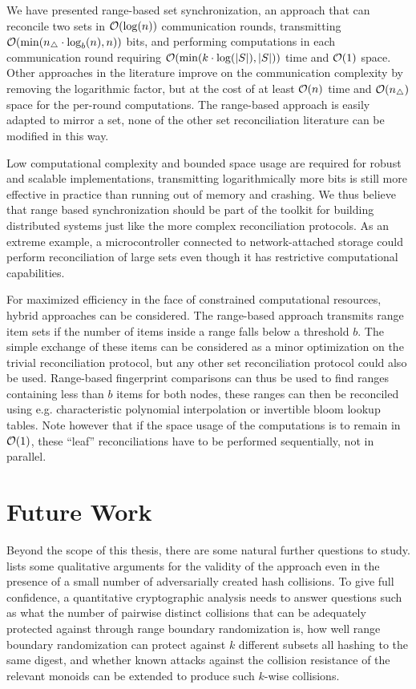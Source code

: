 
We have presented range-based set synchronization, an approach that can reconcile two sets in $\mathcal{O}(\log(n))$ communication rounds, transmitting $\mathcal{O}(\min(n_{\triangle} \cdot \log_b(n), n))$ bits, and performing computations in each communication round requiring $\mathcal{O}(\min(k \cdot \log(|{S}|), |{S}|))$ time and $\mathcal{O}(1)$ space. Other approaches in the literature improve on the communication complexity by removing the logarithmic factor, but at the cost of at least $\mathcal{O}(n)$ time and $\mathcal{O}(n_{\triangle})$ space for the per-round computations. The range-based approach is easily adapted to mirror a set, none of the other set reconciliation literature can be modified in this way.

Low computational complexity and bounded space usage are required for robust and scalable implementations, transmitting logarithmically more bits is still more effective in practice than running out of memory and crashing. We thus believe that range based synchronization should be part of the toolkit for building distributed systems just like the more complex reconciliation protocols. As an extreme example, a microcontroller connected to network-attached storage could perform reconciliation of large sets even though it has restrictive computational capabilities.

For maximized efficiency in the face of constrained computational resources, hybrid approaches can be considered. The range-based approach transmits range item sets if the number of items inside a range falls below a threshold $b$. The simple exchange of these items can be considered as a minor optimization on the trivial reconciliation protocol, but any other set reconciliation protocol could also be used. Range-based fingerprint comparisons can thus be used to find ranges containing less than $b$ items for both nodes, these ranges can then be reconciled using e.g. characteristic polynomial interpolation or invertible bloom lookup tables. Note however that if the space usage of the computations is to remain in $\mathcal{O}(1)$, these ``leaf'' reconciliations have to be performed sequentially, not in parallel.

\section{Future Work}

Beyond the scope of this thesis, there are some natural further questions to study.  lists some qualitative arguments for the validity of the approach even in the presence of a small number of adversarially created hash collisions. To give full confidence, a quantitative cryptographic analysis needs to answer questions such as what the number of pairwise distinct collisions that can be adequately protected against through range boundary randomization is, how well range boundary randomization can protect against $k$ different subsets all hashing to the same digest, and whether known attacks against the collision resistance of the relevant monoids can be extended to produce such $k$-wise collisions.

